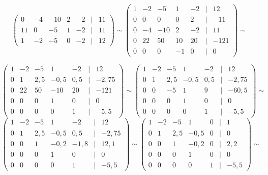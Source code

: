 \documentclass{article}
\begin{document}
\begin{enumerate}
\begin{description}
\[\begin{pmatrix}
0 & -4 & -10 & 2 & -2 & | &  11 \\
11 & 0 & -5 & 1 & -2 & | & 11 \\
1 & -2 & -5 & 0 & -2 & | & 12
\end{pmatrix}
\sim
\begin{pmatrix}
    1& -2 &  -5 & 1 & -2 & | & 12 \\
    0 & 0 &  0 & 0 & 2 & | & -11 \\
    0 & -4 & -10 & 2 & -2 & | &  11 \\
    0 & 22 & 50 & 10 & 20 & | & -121 \\
    0 & 0 & 0 & -1 & 0 & | & 0
\end{pmatrix}
\sim
\]

\[
\begin{pmatrix}
    1& -2 &  -5 & 1 & -2 & | & 12 \\
    0 & 1 & 2,5 & -0,5 & 0,5 & | &  -2,75 \\
    0 & 22 & 50 & -10 & 20 & | & -121 \\
    0 & 0 & 0 & 1 & 0 & | & 0 \\
    0 & 0 &  0 & 0 & 1 & | & -5,5
\end{pmatrix}
\sim
\begin{pmatrix}
    1& -2 &  -5 & 1 & -2 & | & 12 \\
    0 & 1 & 2,5 & -0,5 & 0,5 & | &  -2,75 \\
    0 & 0 & -5 & 1 & 9 & | & -60,5 \\
    0 & 0 & 0 & 1 & 0 & | & 0 \\
    0 & 0 &  0 & 0 & 1 & | & -5,5
\end{pmatrix}
\sim
\]
\[
\begin{pmatrix}
    1& -2 &  -5 & 1 & -2 & | & 12 \\
    0 & 1 & 2,5 & -0,5 & 0,5 & | &  -2,75 \\
    0 & 0 & 1 & -0,2 & -1,8 & | & 12,1 \\
    0 & 0 & 0 & 1 & 0 & | & 0 \\
    0 & 0 &  0 & 0 & 1 & | & -5,5
\end{pmatrix}
\sim
\begin{pmatrix}
    1& -2 &  -5 & 1 & 0 & | & 1 \\
    0 & 1 & 2,5 & -0,5 & 0 & | &  0 \\
    0 & 0 & 1 & -0,2 & 0 & | & 2,2 \\
    0 & 0 & 0 & 1 & 0 & | & 0 \\
    0 & 0 &  0 & 0 & 1 & | & -5,5
\end{pmatrix}
\sim
\]
\[
\]
\end{description}
\end{enumerate}
\end{document}

